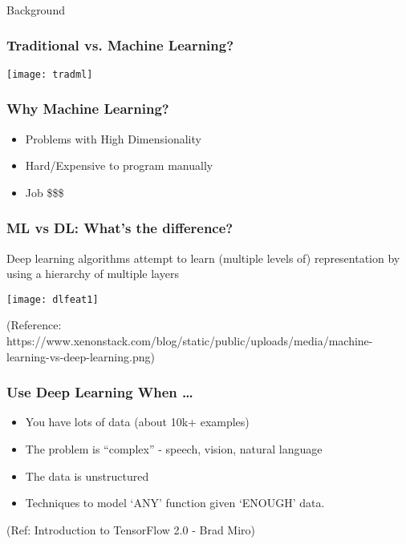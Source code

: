 \begin{frame}[fragile]\frametitle{}
\begin{center}
{\Large Background}
\end{center}
\end{frame}

\begin{frame}[fragile]\frametitle{Traditional vs. Machine Learning?}
\begin{center}
\texttt{[image: tradml]}
\end{center}
\end{frame}

\begin{frame}[fragile]\frametitle{Why Machine Learning?}
\begin{itemize}
\item Problems with High Dimensionality
\item Hard/Expensive to program manually
\item Job \$\$\$
\end{itemize}
\end{frame}



\begin{frame}[fragile] \frametitle{ML vs DL: What's the difference?}
Deep learning algorithms attempt to learn (multiple levels of) representation by using a hierarchy of multiple layers
\begin{center}
\texttt{[image: dlfeat1]}
\end{center}
\tiny{(Reference: https://www.xenonstack.com/blog/static/public/uploads/media/machine-learning-vs-deep-learning.png)}

\end{frame}

\begin{frame}[fragile] \frametitle{Use Deep Learning When \ldots}

\begin{itemize}
\item You have lots of data (about 10k+ examples)
\item The problem is ``complex'' - speech, vision, natural language
\item The data is unstructured 
\item Techniques to model `ANY' function given `ENOUGH' data.
\end{itemize}
\tiny{(Ref: Introduction to TensorFlow 2.0 - Brad Miro)}
\end{frame}

